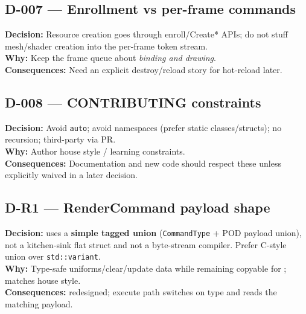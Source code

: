 \subsection*{D-007 --- Enrollment vs per-frame commands}
\begin{decisionbox}[title={D-007 \quad visible in Renderer comments}]
\textbf{Decision:} Resource creation goes through enroll/Create* APIs; do not
stuff mesh/shader creation into the per-frame token stream.\\
\textbf{Why:} Keep the frame queue about \emph{binding and drawing}.\\
\textbf{Consequences:} Need an explicit destroy/reload story for hot-reload
later.
\end{decisionbox}

\subsection*{D-008 --- CONTRIBUTING constraints}
\begin{decisionbox}[title={D-008 \quad from CONTRIBUTING.md}]
\textbf{Decision:} Avoid \texttt{auto}; avoid namespaces (prefer static
classes/structs); no recursion; third-party via PR.\\
\textbf{Why:} Author house style / learning constraints.\\
\textbf{Consequences:} Documentation and new code should respect these unless
explicitly waived in a later decision.
\end{decisionbox}

\subsection*{D-R1 --- RenderCommand payload shape}
\begin{decisionbox}[title={D-R1 \quad 2026-07-28}]
\textbf{Decision:}  uses a \textbf{simple tagged union}
(\texttt{CommandType} + POD payload union), not a kitchen-sink flat struct and
not a byte-stream compiler. Prefer C-style union over \texttt{std::variant}.\\
\textbf{Why:} Type-safe uniforms/clear/update data while remaining
copyable for ; matches house style.\\
\textbf{Consequences:}  redesigned; execute
path switches on type and reads the matching payload.
\end{decisionbox}


